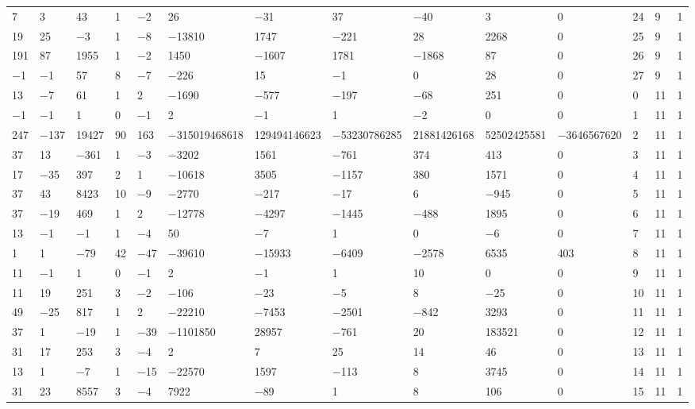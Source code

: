 \documentclass[10pt,a4paper]{amsart}
\numberwithin{equation}{section}
\theoremstyle{definition}
\numberwithin{table}{section}
\begin{document}
{\begin{paracol}{3}
\begin{supertabular}{|w{c}{.32cm}w{c}{.32cm}w{c}{.32cm}@{\hspace{.5cm}}w{c}{.2cm}w{c}{.2cm}|@{\hspace{\tabcolsep}}HHHHHHw{c}{.17cm}w{c}{.17cm}w{c}{.17cm}|}
			7 & 3 & 43 & 1 & $-$2 & 26 & $-$31 & 37 & $-$40 & 3 & 0 & 24 & 9 & 1 \\
			19 & 25 & $-$3 & 1 & $-$8 & $-$13810 & 1747 & $-$221 & 28 & 2268 & 0 & 25 & 9 & 1 \\
			191 & 87 & 1955 & 1 & $-$2 & 1450 & $-$1607 & 1781 & $-$1868 & 87 & 0 & 26 & 9 & 1 \\
			$-$1 & $-$1 & 57 & 8 & $-$7 & $-$226 & 15 & $-$1 & 0 & 28 & 0 & 27 & 9 & 1 \\
			13 & $-$7 & 61 & 1 & 2 & $-$1690 & $-$577 & $-$197 & $-$68 & 251 & 0 & 0 & 11 & 1 \\
			$-$1 & $-$1 & 1 & 0 & $-$1 & 2 & $-$1 & 1 & $-$2 & 0 & 0 & 1 & 11 & 1\\
			247 & $-$137 & 19427 & 90 & 163 & $-$315019468618 & 129494146623 & $-$53230786285 & 21881426168 & 52502425581 & $-$3646567620 & 2 & 11 & 1 \\
			37 & 13 & $-$361 & 1 & $-$3 & $-$3202 & 1561 & $-$761 & 374 & 413 & 0 & 3 & 11 & 1 \\
			17 & $-$35 & 397 & 2 & 1 & $-$10618 & 3505 & $-$1157 & 380 & 1571 & 0 & 4 & 11 & 1 \\
			37 & 43 & 8423 & 10 & $-$9 & $-$2770 & $-$217 & $-$17 & 6 & $-$945 & 0 & 5 & 11 & 1 \\
			37 & $-$19 & 469 & 1 & 2 & $-$12778 & $-$4297 & $-$1445 & $-$488 & 1895 & 0 & 6 & 11 & 1 \\
			13 & $-$1 & $-$1 & 1 & $-$4 & 50 & $-$7 & 1 & 0 & $-$6 & 0 & 7 & 11 & 1 \\
			1 & 1 & $-$79 & 42 & $-$47 & $-$39610 & $-$15933 & $-$6409 & $-$2578 & 6535 & 403 & 8 & 11 & 1 \\
			11 & $-$1 & 1 & 0 & $-$1 & 2 & $-$1 & 1 & 10 & 0 & 0 & 9 & 11 & 1 \\
			11 & 19 & 251 & 3 & $-$2 & $-$106 & $-$23 & $-$5 & 8 & $-$25 & 0 & 10 & 11 & 1 \\
			49 & $-$25 & 817 & 1 & 2 & $-$22210 & $-$7453 & $-$2501 & $-$842 & 3293 & 0 & 11 & 11 & 1 \\
			37 & 1 & $-$19 & 1 & $-$39 & $-$1101850 & 28957 & $-$761 & 20 & 183521 & 0 & 12 & 11 & 1 \\
			31 & 17 & 253 & 3 & $-$4 & 2 & 7 & 25 & 14 & 46 & 0 & 13 & 11 & 1 \\
			13 & 1 & $-$7 & 1 & $-$15 & $-$22570 & 1597 & $-$113 & 8 & 3745 & 0 & 14 & 11 & 1 \\
			31 & 23 & 8557 & 3 & $-$4 & 7922 & $-$89 & 1 & 8 & 106 & 0 & 15 & 11 & 1 \\

\end{supertabular}
\end{paracol}}
\end{document}
